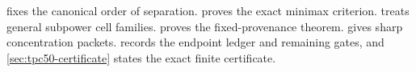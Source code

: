 fixes the canonical order of
separation.   proves the exact
minimax criterion.   treats general
subpower cell families.   proves the
fixed-provenance theorem.   gives sharp
concentration packets.   records
the endpoint ledger and remaining gates, and
\cref{sec:tpc50-certificate} states the exact finite certificate.
